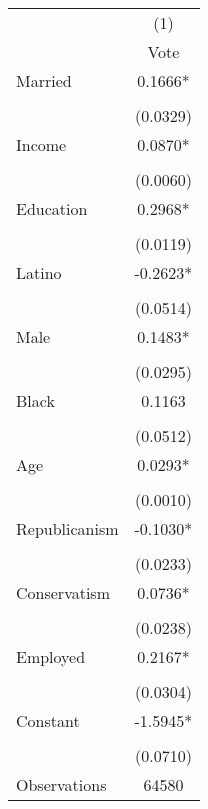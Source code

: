 {
\def\sym#1{\ifmmode^{#1}\else\(^{#1}\)\fi}
\begin{tabular}{l*{1}{c}}
\hline\hline
                              &\multicolumn{1}{c}{(1)} \\
                              &     Vote \\
\hline
Married                       &   0.1666*\\
                              &          \\
                              & (0.0329) \\
Income                        &   0.0870*\\
                              &          \\
                              & (0.0060) \\
Education                     &   0.2968*\\
                              &          \\
                              & (0.0119) \\
Latino                        &  -0.2623*\\
                              &          \\
                              & (0.0514) \\
Male                          &   0.1483*\\
                              &          \\
                              & (0.0295) \\
Black                         &   0.1163 \\
                              &          \\
                              & (0.0512) \\
Age                           &   0.0293*\\
                              &          \\
                              & (0.0010) \\
Republicanism                 &  -0.1030*\\
                              &          \\
                              & (0.0233) \\
Conservatism                  &   0.0736*\\
                              &          \\
                              & (0.0238) \\
Employed                      &   0.2167*\\
                              &          \\
                              & (0.0304) \\
Constant                      &  -1.5945*\\
                              &          \\
                              & (0.0710) \\
\hline
Observations                  &    64580 \\
\hline\hline
\end{tabular}
}
